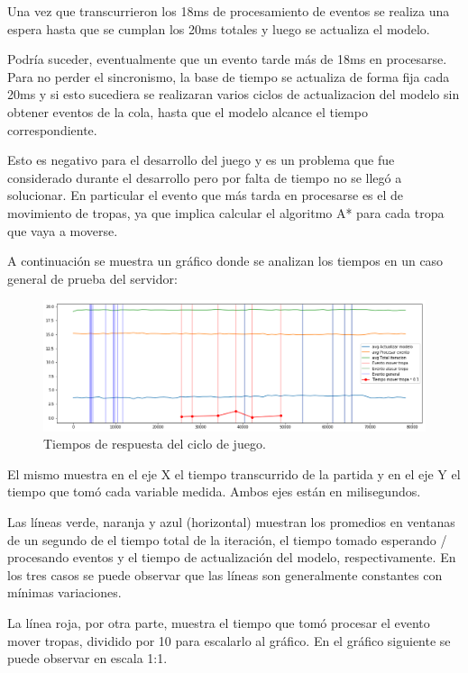 \documentclass[titlepage,a4paper,12pt]{article}
\begin{document}
Una vez que transcurrieron los 18ms de procesamiento de eventos se realiza una espera hasta que se cumplan los 20ms totales y luego se actualiza el modelo.

Podría suceder, eventualmente que un evento tarde más de 18ms en procesarse. Para no perder el sincronismo, la base de tiempo se actualiza de forma fija cada 20ms y si esto sucediera se realizaran varios ciclos de actualizacion del modelo sin obtener eventos de la cola, hasta que el modelo alcance el tiempo correspondiente.

Esto es negativo para el desarrollo del juego y es un problema que fue considerado durante el desarrollo pero por falta de tiempo no se llegó a solucionar. En particular el evento que más tarda en procesarse es el de movimiento de tropas, ya que implica calcular el algoritmo A* para cada tropa que vaya a moverse.

A continuación se muestra un gráfico donde se analizan los tiempos en un caso general de prueba del servidor:

\begin{figure}[H]
	\centering
	\includegraphics[width=16cm]{../imagenes/analisis-tiempos-1.png}
	\caption{\label{fig:tiempos-ciclo-juego-1} Tiempos de respuesta del ciclo de juego.}
\end{figure}

El mismo muestra en el eje X el tiempo transcurrido de la partida y en el eje Y el tiempo que tomó cada variable medida. Ambos ejes están en milisegundos.

Las líneas verde, naranja y azul (horizontal) muestran los promedios en ventanas de un segundo de el tiempo total de la iteración, el tiempo tomado esperando / procesando eventos y el tiempo de actualización del modelo, respectivamente. En los tres casos se puede observar que las líneas son generalmente constantes con mínimas variaciones.

La línea roja, por otra parte, muestra el tiempo que tomó procesar el evento mover tropas, dividido por 10 para escalarlo al gráfico. En el gráfico siguiente se puede observar en escala 1:1.
\end{document}
